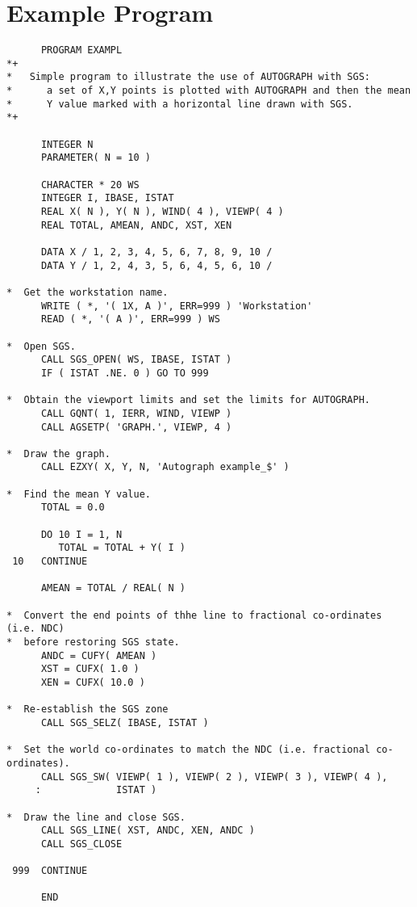 \appendix
\newpage


\section{Example Program} \label{exam_sect}

\small
\begin{verbatim}
      PROGRAM EXAMPL
*+
*   Simple program to illustrate the use of AUTOGRAPH with SGS:
*      a set of X,Y points is plotted with AUTOGRAPH and then the mean 
*      Y value marked with a horizontal line drawn with SGS.
*+

      INTEGER N
      PARAMETER( N = 10 )

      CHARACTER * 20 WS
      INTEGER I, IBASE, ISTAT
      REAL X( N ), Y( N ), WIND( 4 ), VIEWP( 4 )
      REAL TOTAL, AMEAN, ANDC, XST, XEN

      DATA X / 1, 2, 3, 4, 5, 6, 7, 8, 9, 10 /
      DATA Y / 1, 2, 4, 3, 5, 6, 4, 5, 6, 10 /

*  Get the workstation name.
      WRITE ( *, '( 1X, A )', ERR=999 ) 'Workstation'
      READ ( *, '( A )', ERR=999 ) WS

*  Open SGS.
      CALL SGS_OPEN( WS, IBASE, ISTAT )
      IF ( ISTAT .NE. 0 ) GO TO 999

*  Obtain the viewport limits and set the limits for AUTOGRAPH.
      CALL GQNT( 1, IERR, WIND, VIEWP )
      CALL AGSETP( 'GRAPH.', VIEWP, 4 )

*  Draw the graph.
      CALL EZXY( X, Y, N, 'Autograph example_$' )

*  Find the mean Y value.
      TOTAL = 0.0

      DO 10 I = 1, N
         TOTAL = TOTAL + Y( I )
 10   CONTINUE

      AMEAN = TOTAL / REAL( N )

*  Convert the end points of thhe line to fractional co-ordinates (i.e. NDC)
*  before restoring SGS state.
      ANDC = CUFY( AMEAN )
      XST = CUFX( 1.0 )
      XEN = CUFX( 10.0 )

*  Re-establish the SGS zone
      CALL SGS_SELZ( IBASE, ISTAT )

*  Set the world co-ordinates to match the NDC (i.e. fractional co-ordinates).
      CALL SGS_SW( VIEWP( 1 ), VIEWP( 2 ), VIEWP( 3 ), VIEWP( 4 ), 
     :             ISTAT )

*  Draw the line and close SGS.
      CALL SGS_LINE( XST, ANDC, XEN, ANDC )
      CALL SGS_CLOSE

 999  CONTINUE

      END
\end{verbatim}
\normalsize


